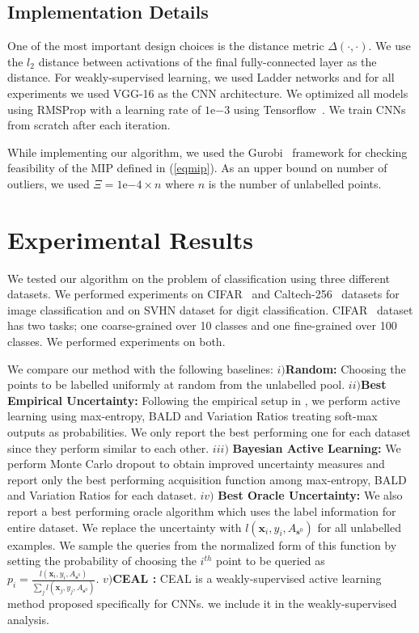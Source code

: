 \documentclass{article} %
\begin{document}
\subsection{Implementation Details} \label{sec:imp} One of the most important design choices is the distance metric
$\Delta(\cdot,\cdot)$. We use the $l_2$ distance between activations of the final fully-connected layer as the distance.
For weakly-supervised learning, we used Ladder networks \citep{ladder} and for all experiments we used VGG-16 \citep{vgg}
as the CNN architecture. We optimized all models using RMSProp with a learning rate of $1\mathrm{e}{-3}$ using
Tensorflow~\citep{tensorflow}. We train CNNs from scratch after each iteration. %

While implementing our algorithm, we used the Gurobi~\citep{gurobi} framework for checking feasibility of the MIP defined
in (\ref{eqmip}). As an upper bound on number of outliers, we used $\Xi=1\mathrm{e}{-4} \times n$ where $n$ is the
number of unlabelled points.

\newpage

\section{Experimental Results} \label{sec:exp} We tested our algorithm on the problem of classification using three
different datasets. We performed experiments on CIFAR~\citep{cifar} and Caltech-256~\citep{caltech256} datasets for
image classification and on SVHN\citep{svhn} dataset for digit classification. CIFAR~\citep{cifar} dataset has two
tasks; one coarse-grained over 10 classes and one fine-grained over 100 classes. We performed experiments on both.

We compare our method with the following baselines: $i)$\textbf{Random:} Choosing the points to be labelled uniformly at
random from the unlabelled pool. $ii)$\textbf{Best Empirical Uncertainty:} Following the empirical setup in
\citep{gal_active}, we perform active learning using max-entropy, BALD and Variation Ratios treating soft-max outputs as
probabilities. We only report the best performing one for each dataset since they perform similar to each other. $iii)$
\textbf{Bayesian Active Learning:} We perform Monte Carlo dropout to obtain improved uncertainty measures and report
only the best performing acquisition function among max-entropy, BALD and Variation Ratios for each dataset. $iv)$
\textbf{Best Oracle Uncertainty:} We also report a best performing oracle algorithm which uses the label information for
entire dataset. We replace the uncertainty with $l(\mathbf{x}_i,y_i,A_{\mathbf{s}^0})$ for all unlabelled examples. We
sample the queries from the normalized form of this function by setting the probability of choosing the $i^{th}$ point
to be queried as $p_i=\frac{l(\mathbf{x}_i,y_i,A_{\mathbf{s}^0})}{\sum_j l(\mathbf{x}_j,y_j,A_{\mathbf{s}^0})}$.
$v)$\textbf{CEAL \citep{wang2016cost}:} CEAL \citep{wang2016cost} is a weakly-supervised active learning method proposed
specifically for CNNs. we include it in the weakly-supervised analysis.
\end{document}
